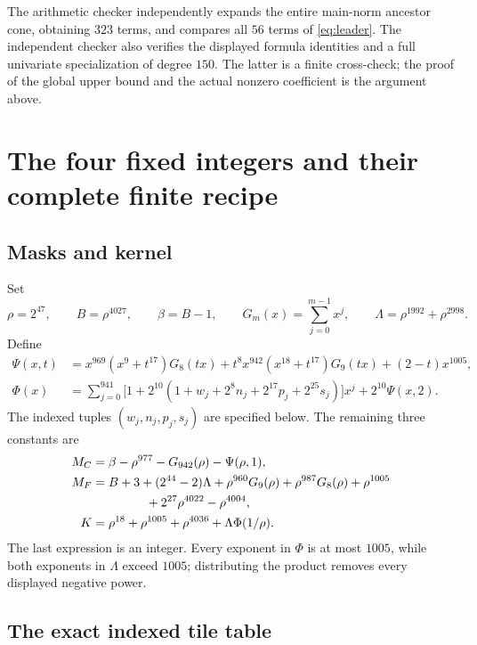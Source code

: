 \documentclass[11pt,letterpaper]{article}
\theoremstyle{definition}
\begin{document}
The arithmetic checker independently expands the entire main-norm
ancestor cone, obtaining \(323\) terms, and compares all \(56\) terms
of \eqref{eq:leader}. The independent checker also verifies the
displayed formula identities and a full univariate specialization of
degree \(150\). The latter is a finite cross-check; the proof of the
global upper bound and the actual nonzero coefficient is the argument
above.

\section{The four fixed integers and their complete finite recipe}
\label{sec:constants}

\subsection{Masks and kernel}

Set
\[
 \rho=2^{47},\qquad B=\rho^{4027},\qquad\beta=B-1,\qquad
 G_m(x)=\sum_{j=0}^{m-1}x^j,\qquad
 \Lambda=\rho^{1992}+\rho^{2998}.
\]
Define
\begin{align}
 \Psi(x,t)
   &=x^{969}(x^9+t^{17})G_8(tx)
     +t^8x^{942}(x^{18}+t^{17})G_9(tx)
     +(2-t)x^{1005},\label{eq:Psi}\\
 \Phi(x)
   &=\sum_{j=0}^{941}
       \bigl[1+2^{10}(1+w_j+2^8n_j+2^{17}p_j+2^{25}s_j)\bigr]x^j
       +2^{10}\Psi(x,2).\label{eq:Phi}
\end{align}
The indexed tuples \((w_j,n_j,p_j,s_j)\) are specified below.
The remaining three constants are
\begin{align}
 M_C={}&\beta-\rho^{977}-G_{942}(\rho)-\Psi(\rho,1),\label{eq:MC}\\
 M_F={}&B+3+(2^{44}-2)\Lambda
       +\rho^{960}G_9(\rho)+\rho^{987}G_8(\rho)+\rho^{1005}\notag\\
       &\hspace{3em}+2^{27}\rho^{4022}-\rho^{4004},\label{eq:MF}\\
 K={}&\rho^{18}+\rho^{1005}+\rho^{4036}
            +\Lambda\Phi(1/\rho).\label{eq:K}
\end{align}
The last expression is an integer. Every exponent in \(\Phi\) is at
most \(1005\), while both exponents in \(\Lambda\) exceed \(1005\);
distributing the product removes every displayed negative power.

\subsection{The exact indexed tile table}
\end{document}
